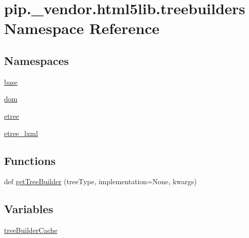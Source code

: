 \hypertarget{namespacepip_1_1__vendor_1_1html5lib_1_1treebuilders}{}\section{pip.\+\_\+vendor.\+html5lib.\+treebuilders Namespace Reference}
\label{namespacepip_1_1__vendor_1_1html5lib_1_1treebuilders}
\subsection*{Namespaces}
\begin{DoxyCompactItemize}
\item 
 \hyperlink{namespacepip_1_1__vendor_1_1html5lib_1_1treebuilders_1_1base}{base}
\item 
 \hyperlink{namespacepip_1_1__vendor_1_1html5lib_1_1treebuilders_1_1dom}{dom}
\item 
 \hyperlink{namespacepip_1_1__vendor_1_1html5lib_1_1treebuilders_1_1etree}{etree}
\item 
 \hyperlink{namespacepip_1_1__vendor_1_1html5lib_1_1treebuilders_1_1etree__lxml}{etree\+\_\+lxml}
\end{DoxyCompactItemize}
\subsection*{Functions}
\begin{DoxyCompactItemize}
\item 
def \hyperlink{namespacepip_1_1__vendor_1_1html5lib_1_1treebuilders_a127aeb9dfbb8079a4ec65284e191d81c}{get\+Tree\+Builder} (tree\+Type, implementation=None, kwargs)
\end{DoxyCompactItemize}
\subsection*{Variables}
\begin{DoxyCompactItemize}
\item 
\hyperlink{namespacepip_1_1__vendor_1_1html5lib_1_1treebuilders_af20116ca2f6a2765396a54f21e84261e}{tree\+Builder\+Cache}
\end{DoxyCompactItemize}


